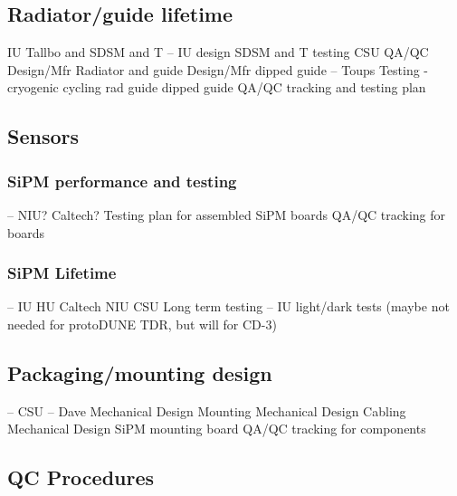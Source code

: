 \subsection{Radiator/guide lifetime}
     IU Tallbo and SDSM and T  -- IU design SDSM and T testing  CSU QA/QC
     Design/Mfr Radiator and guide
     Design/Mfr dipped guide -- Toups
     Testing - cryogenic cycling 
          rad
          guide
          dipped guide
     QA/QC tracking and testing plan  

\subsection{Sensors}

\subsubsection{SiPM performance and testing}
      -- NIU? Caltech?
     Testing plan for assembled SiPM boards
     QA/QC tracking for boards     

\subsubsection{SiPM Lifetime}
      -- IU HU Caltech NIU CSU 
     Long term testing -- IU light/dark tests     
     (maybe not needed for protoDUNE TDR, but will for CD-3)

\subsection{Packaging/mounting design}
      -- CSU  -- Dave
     Mechanical Design Mounting 
     Mechanical Design Cabling
     Mechanical Design SiPM mounting board
     QA/QC tracking for components


\subsection{QC Procedures}



